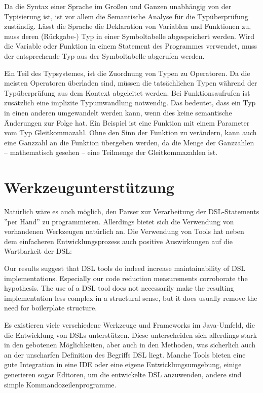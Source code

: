 Da die Syntax einer Sprache im Großen und Ganzen unabhängig von der Typisierung ist, ist vor allem die Semantische Analyse für die Typ\-über\-prü\-fung zuständig. Lässt die Sprache die Deklaration von Variablen und Funktionen zu, muss deren (Rückgabe-) Typ in einer Symboltabelle abgespeichert werden. Wird die Variable oder Funktion in einem Statement des Programmes verwendet, muss der entsprechende Typ aus der Symboltabelle abgerufen werden.

Ein Teil des Typsystemes, ist die Zuordnung von Typen zu Operatoren. Da die meisten Operatoren überladen sind, müssen die tatsächlichen Typen während der Typ\-über\-prü\-fung aus dem Kontext abgeleitet werden. Bei Funktionsaufrufen ist zusätzlich eine implizite Typumwandlung not\-wen\-dig. Das bedeutet, dass ein Typ in einen anderen umgewandelt werden kann, wenn dies keine semantische Änderungen zur Folge hat. Ein Beispiel ist eine Funktion mit einem Parameter vom Typ Gleitkommazahl. Ohne den Sinn der Funktion zu verändern, kann auch eine Ganzzahl an die Funktion übergeben werden, da die Menge der Ganzzahlen -- mathematisch gesehen -- eine Teilmenge der Gleitkommazahlen ist.


\chapter{Werkzeugunterstützung}
\label{chapter_tools}

Natürlich wäre es auch möglich, den Parser zur Verarbeitung der DSL-Statements ''per Hand'' zu programmieren. Allerdings bietet sich die Verwendung von vorhandenen Werkzeugen natürlich an. Die Verwendung von Tools hat neben dem einfacheren Entwicklungsprozess auch positive Aus\-wir\-kun\-gen auf die Wartbarkeit der DSL:

\begin{myquote}
Our results suggest that DSL tools do indeed increase maintainability
of DSL implementations. Especially our code reduction measurements
corroborate the hypothesis. The use of a DSL tool does
not necessarily make the resulting implementation less complex in
a structural sense, but it does usually remove the need for boilerplate
structure. \cite{KlSt10}
\end{myquote}

Es existieren viele verschiedene Werkzeuge und Frameworks im  Java-Umfeld, die die Entwicklung von DSLs unterstützen. Diese unterscheiden sich allerdings stark in den gebotenen Möglichkeiten, aber auch in den Methoden, was sicherlich auch an der unscharfen Definition des Begriffs DSL liegt. Manche Tools bieten eine gute Integration in eine IDE oder eine eigene Entwicklungsumgebung, einige generieren sogar Editoren, um die entwickelte DSL anzuwenden, andere sind simple Kommandozeilenprogramme.

